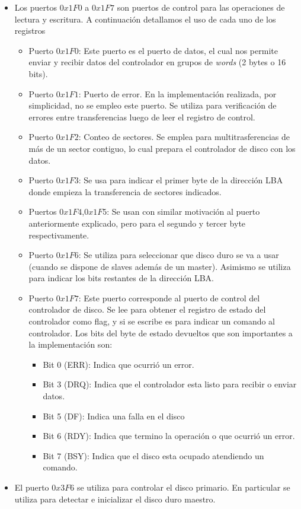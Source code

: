 \begin{itemize}
	\item Los puertos $0x1F0$ a $0x1F7$ son puertos de control para las operaciones de
	lectura y escritura. A continuaci\'on detallamos el uso de cada uno de los registros

	\begin{itemize}
		\item Puerto $0x1F0$: Este puerto es el puerto de datos, el cual nos permite enviar
		y recibir datos del controlador en grupos de \textit{words} (2 bytes o 16 bits).
		\item Puerto $0x1F1$: Puerto de error. En la implementaci\'on realizada, por simplicidad,
		no se empleo este puerto. Se utiliza para verificaci\'on de errores entre transferencias
		luego de leer el registro de control.
		\item Puerto $0x1F2$: Conteo de sectores. Se emplea para multitrasferencias de m\'as de
		un sector contiguo, lo cual prepara el controlador de disco con los datos.
		\item Puerto $0x1F3$: Se usa para indicar el primer byte de la direcci\'on LBA donde empieza
		la transferencia de sectores indicados.
		\item Puertos $0x1F4$,$0x1F5$: Se usan con similar motivaci\'on al puerto anteriormente explicado,
		pero para el segundo y tercer byte respectivamente.
		\item Puerto $0x1F6$: Se utiliza para seleccionar que disco duro se va a usar (cuando se dispone de
		slaves adem\'as de un master). Asimismo se utiliza para indicar los bits restantes de la direcci\'on
		LBA.
		\item Puerto $0x1F7$: Este puerto corresponde al puerto de control del controlador de disco. Se lee
		para obtener el registro de estado del controlador como flag, y si se escribe es para indicar un
		comando al controlador. Los bits del byte de estado devueltos que son importantes a la implementaci\'on
		son:

		\begin{itemize}
			\item Bit 0 (ERR): Indica que ocurri\'o un error.
			\item Bit 3 (DRQ): Indica que el controlador esta listo para recibir o enviar datos.
			\item Bit 5 (DF):  Indica una falla en el disco
			\item Bit 6 (RDY): Indica que termino la operaci\'on o que ocurri\'o un error.
			\item Bit 7 (BSY): Indica que el disco esta ocupado atendiendo un comando.
		\end{itemize}
	\end{itemize}
	
	\item El puerto $0x3F6$ se utiliza para controlar el disco primario. En particular se utiliza para detectar e
	inicializar el disco duro maestro.
\end{itemize}

